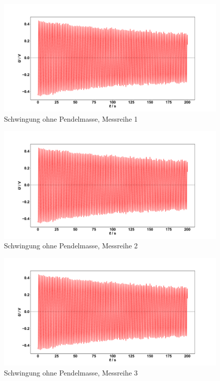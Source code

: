 \begin{figure}[H]
	\centering
	\includegraphics[width=1\textwidth]{Schwingung1_ohne.pdf}
	\caption{Schwingung ohne Pendelmasse, Messreihe 1}
	\label{fig:Schwingung1_ohne}
\end{figure}
\begin{figure}[H]
	\centering
	\includegraphics[width=1\textwidth]{Schwingung2_ohne.pdf}
	\caption{Schwingung ohne Pendelmasse, Messreihe 2}
	\label{fig:Schwingung2_ohne}
\end{figure}
\begin{figure}[H]
	\centering
	\includegraphics[width=1\textwidth]{Schwingung3_ohne.pdf}
	\caption{Schwingung ohne Pendelmasse, Messreihe 3}
	\label{fig:Schwingung3_ohne}
\end{figure}
